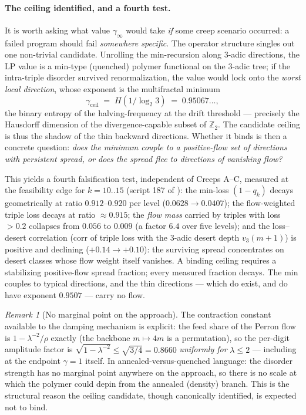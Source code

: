 \documentclass[11pt]{article}
\theoremstyle{definition}
\theoremstyle{remark}
\newtheorem{remark}[theorem]{Remark}
\newcommand{\Z}{\mathbb{Z}}
\newcommand{\lam}{\lambda}
\newcommand{\gam}{\gamma}
\begin{document}
\paragraph{The ceiling identified, and a fourth test.}
It is worth asking what value $\gam_\infty$ would take \emph{if} some creep
scenario occurred: a failed program should fail \emph{somewhere specific}. The
operator structure singles out one non-trivial candidate. Unrolling the
min-recursion along $3$-adic directions, the LP value is a min-type (quenched)
polymer functional on the $3$-adic tree; if the intra-triple disorder survived
renormalization, the value would lock onto the \emph{worst local direction},
whose exponent is the multifractal minimum
\[
\gam_{\mathrm{ceil}} \;=\; H\!\left(1/\log_2 3\right)\;=\;0.95067\ldots,
\]
the binary entropy of the halving-frequency at the drift threshold ---
precisely the Hausdorff dimension of the divergence-capable subset of
$\Z_2$. The candidate ceiling is thus the shadow of the thin backward
directions. Whether it binds is then a concrete question: \emph{does the
minimum couple to a positive-flow set of directions with persistent spread, or
does the spread flee to directions of vanishing flow?}

This yields a fourth falsification test, independent of Creeps A--C, measured
at the feasibility edge for $k = 10..15$ (script 187 of \cite{NOTE}): the
min-loss $(1-q_k)$ decays geometrically at ratio $0.912$--$0.920$ per level
($0.0628 \to 0.0407$); the flow-weighted triple loss decays at ratio
$\approx 0.915$; the \emph{flow mass} carried by triples with loss $> 0.2$
collapses from $0.056$ to $0.009$ (a factor $6.4$ over five levels); and the
loss--desert correlation ($\mathrm{corr}$ of triple loss with the $3$-adic
desert depth $v_3(m+1)$) is positive and declining ($+0.14 \to +0.10$): the
surviving spread concentrates on desert classes whose flow weight itself
vanishes. A binding ceiling requires a stabilizing positive-flow spread
fraction; every measured fraction decays. The min couples to typical
directions, and the thin directions --- which do exist, and do have exponent
$0.9507$ --- carry no flow.

\begin{remark}[No marginal point on the approach]
The contraction constant available to the damping mechanism is explicit: the
feed share of the Perron flow is $1 - \lam^{-2}/\rho$ exactly (the backbone
$m \mapsto 4m$ is a permutation), so the per-digit amplitude factor is
$\sqrt{1-\lam^{-2}} \le \sqrt{3/4} = 0.8660$ \emph{uniformly for}
$\lam \le 2$ --- including at the endpoint $\gam = 1$ itself. In
annealed-versus-quenched language: the disorder strength has no marginal point
anywhere on the approach, so there is no scale at which the polymer could
depin from the annealed (density) branch. This is the structural reason the
ceiling candidate, though canonically identified, is expected not to bind.
\end{remark}
\end{document}
